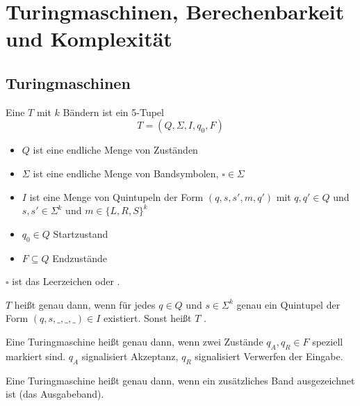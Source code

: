 




\chapter{Turingmaschinen, Berechenbarkeit und Komplexität} %
\label{cha:turingmaschinen_berechenbarkeit_und_komplexitaet}



\section{Turingmaschinen}


\begin{definition}
        
    Eine  $T$ mit $k$ Bändern ist ein 5-Tupel
    $$ T = (Q, \Sigma, I, q_0, F) $$
    \begin{itemize}
        \item $Q$ ist eine endliche Menge von Zuständen
        \item $\Sigma$ ist eine endliche Menge von Bandsymbolen, $\square \in \Sigma$
        \item $I$ ist eine Menge von Quintupeln der Form $(q, s, s', m, q')$ mit $q, q' \in Q$ und $s, s' \in \Sigma^k$ und $m \in \{ L, R, S \}^k$ 
        \item $q_0 \in Q$ Startzustand
        \item $F \subseteq Q$ Endzustände
    \end{itemize}

    $\square$ ist das Leerzeichen oder .

    $T$ heißt  genau dann, wenn für jedes $q \in Q$ und $s \in \Sigma^k$ genau ein Quintupel der Form $(q, s, \_, \_, \_) \in I$ existiert. Sonst heißt $T$ .

    Eine Turingmaschine heißt  genau dann, wenn zwei Zustände $q_A, q_R \in F$ speziell markiert sind. $q_A$ signalisiert Akzeptanz, $q_R$ signalisiert Verwerfen der Eingabe.

    Eine Turingmaschine heißt  genau dann, wenn ein zusätzliches Band ausgezeichnet ist (das Ausgabeband).

\end{definition}



